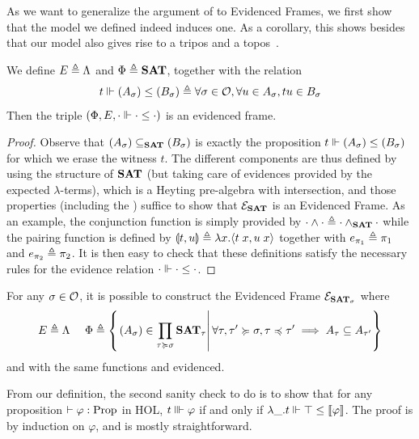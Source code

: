 \documentclass[a4paper,UKenglish,cleveref, autoref, thm-restate]{lipics-v2021}
\begin{document}
As we want to generalize the argument of  to Evidenced Frames,
we first show that the model we defined indeed induces one. As a corollary,
this shows besides that our model also gives rise to a tripos and a topos~\cite{CohMiqTat21}.

\begin{proposition}\label{prop:EF_notre}
  We define $E \triangleq \Lambda$ and $\Phi \triangleq {\mathbf{SAT}}$, together with the relation
  \[t \Vdash (A_\sigma) \leq (B_\sigma)\triangleq \forall \sigma \in \mathcal O, \forall u \in A_{\sigma}, tu \in B_{\sigma}\]
  Then the triple $(\Phi,E,\cdot \Vdash \cdot \leq \cdot)$ is an evidenced frame.
\end{proposition}

\begin{proof}
Observe that $(A_\sigma) \subseteq_{{\mathbf{SAT}}} (B_\sigma)$ is exactly the proposition $t \Vdash (A_\sigma) \leq (B_\sigma)$
for which we erase the witness $t$.
 The different components are thus defined by using the structure of ${\mathbf{SAT}}$ (but taking care of evidences provided
 by the expected $\lambda$-terms),
 which is a Heyting pre-algebra with intersection,
 and those properties (including the )
 suffice to show that $\mathcal{E}_{{\mathbf{SAT}}}$ is an Evidenced Frame.
 As an example, the conjunction function is simply provided by
$\cdot \land \cdot \triangleq \cdot \land_{{\mathbf{SAT}}} \cdot$ while
the pairing function is defined by $\llparenthesis t,u\rrparenthesis \triangleq \lambda x. \langle t\;x,u\;x \rangle$
    together with $e_{\pi_1} \triangleq \pi_1$ and $e_{\pi_2} \triangleq \pi_2$.
It is then easy to check that these definitions satisfy the necessary rules for the evidence relation $\cdot \Vdash \cdot \leq \cdot$.
\end{proof}

\begin{remark}\label{rmk:EFSigma}
  For any $\sigma \in \mathcal O$, it is possible to construct the Evidenced Frame $\mathcal{E}_{{\mathbf{SAT}}_{\sigma}}$ where
  \[E \triangleq \Lambda \quad~ \Phi \triangleq \left\{\left.(A_\sigma)\in\prod_{\tau \succcurlyeq \sigma} {\mathbf{SAT}}_{\tau}\right\vert \forall \tau, \tau'\succcurlyeq \sigma, \tau \preccurlyeq \tau' \implies A_{\tau} \subseteq A_{\tau'} \right\}\]
  and with the same functions and evidenced.
\end{remark}



From our definition, the second sanity check to do is to show that for any proposition $\vdash\varphi : \mathrm{Prop}$ in HOL,
$t \Vvdash \varphi$ if and only if $\lambda\_.t \Vdash \top \leq \llbracket \varphi \rrbracket$.
The proof is by induction on $\varphi$, and is mostly straightforward. 
\end{document}
